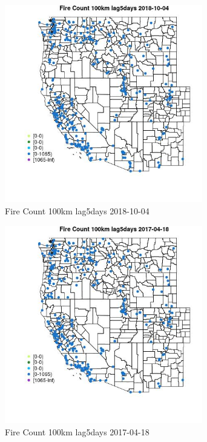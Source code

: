 \begin{figure} 
\centering  
\includegraphics[width=0.77\textwidth]{Code_Outputs/Report_ML_input_PM25_Step4_part_f_de_duplicated_aves_prioritize_24hr_obswNAs_MapObsFire_Count_100km_lag5days2018-10-04.jpg} 
\caption{\label{fig:Report_ML_input_PM25_Step4_part_f_de_duplicated_aves_prioritize_24hr_obswNAsMapObsFire_Count_100km_lag5days2018-10-04}Fire Count 100km lag5days 2018-10-04} 
\end{figure} 
 

\begin{figure} 
\centering  
\includegraphics[width=0.77\textwidth]{Code_Outputs/Report_ML_input_PM25_Step4_part_f_de_duplicated_aves_prioritize_24hr_obswNAs_MapObsFire_Count_100km_lag5days2017-04-18.jpg} 
\caption{\label{fig:Report_ML_input_PM25_Step4_part_f_de_duplicated_aves_prioritize_24hr_obswNAsMapObsFire_Count_100km_lag5days2017-04-18}Fire Count 100km lag5days 2017-04-18} 
\end{figure} 
 


